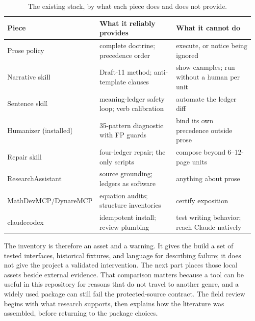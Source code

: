 \begin{table}[t]
\centering
\small
\begin{tabularx}{\textwidth}{@{}l L L@{}}
\toprule
Piece & What it reliably provides & What it cannot do \\
\midrule
Prose policy & complete doctrine; precedence order & execute, or notice being ignored \\
Narrative skill & Draft-11 method; anti-template clauses & show examples; run without a human per unit \\
Sentence skill & meaning-ledger safety loop; verb calibration & automate the ledger diff \\
Humanizer (installed) & 35-pattern diagnostic with FP guards & bind its own precedence outside prose \\
Repair skill & four-ledger repair; the only scripts & compose beyond 6--12-page units \\
ResearchAssistant & source grounding; ledgers as software & anything about prose \\
MathDevMCP/DynareMCP & equation audits; structure inventories & certify exposition \\
claudecodex & idempotent install; review plumbing & test writing behavior; reach Claude natively \\
\bottomrule
\end{tabularx}
\caption{The existing stack, by what each piece does and does not provide.}
\label{tab:tool-gap}
\end{table}

The inventory is therefore an asset and a warning. It gives the build a set of
tested interfaces, historical fixtures, and language for describing failure;
it does not give the project a validated intervention. The next part places
those local assets beside external evidence. That comparison matters because
a tool can be useful in this repository for reasons that do not travel to
another genre, and a widely used package can still fail the protected-source
contract. The field review begins with what research supports, then explains
how the literature was assembled, before returning to the package choices.
